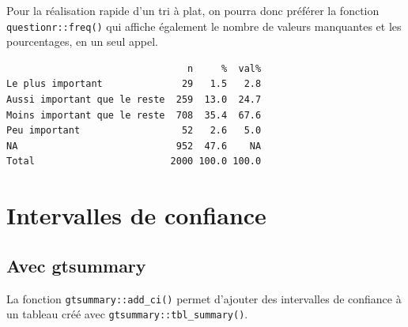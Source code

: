 \documentclass[
  letterpaper,
  DIV=11,
  numbers=noendperiod,
  oneside]{scrreprt}
\newenvironment{Shaded}{\begin{snugshade}}{\end{snugshade}}
\newcommand{\AttributeTok}[1]{\textcolor[rgb]{0.40,0.45,0.13}{#1}}
\newcommand{\ConstantTok}[1]{\textcolor[rgb]{0.56,0.35,0.01}{#1}}
\newcommand{\FunctionTok}[1]{\textcolor[rgb]{0.28,0.35,0.67}{#1}}
\newcommand{\NormalTok}[1]{\textcolor[rgb]{0.00,0.23,0.31}{#1}}
\newcommand{\SpecialCharTok}[1]{\textcolor[rgb]{0.37,0.37,0.37}{#1}}
\begin{document}
Pour la réalisation rapide d'un tri à plat, on pourra donc préférer la
fonction \texttt{questionr::freq()} qui affiche également le nombre de
valeurs manquantes et les pourcentages, en un seul appel.

\begin{Shaded}
\end{Shaded}

\begin{verbatim}
                                n     %  val%
Le plus important              29   1.5   2.8
Aussi important que le reste  259  13.0  24.7
Moins important que le reste  708  35.4  67.6
Peu important                  52   2.6   5.0
NA                            952  47.6    NA
Total                        2000 100.0 100.0
\end{verbatim}

\hypertarget{intervalles-de-confiance}{%
\section{Intervalles de confiance}\label{intervalles-de-confiance}}

\hypertarget{avec-gtsummary}{%
\subsection{Avec gtsummary}\label{avec-gtsummary}}

La fonction \texttt{gtsummary::add\_ci()} permet d'ajouter des
intervalles de confiance à un tableau créé avec
\texttt{gtsummary::tbl\_summary()}.
\end{document}
